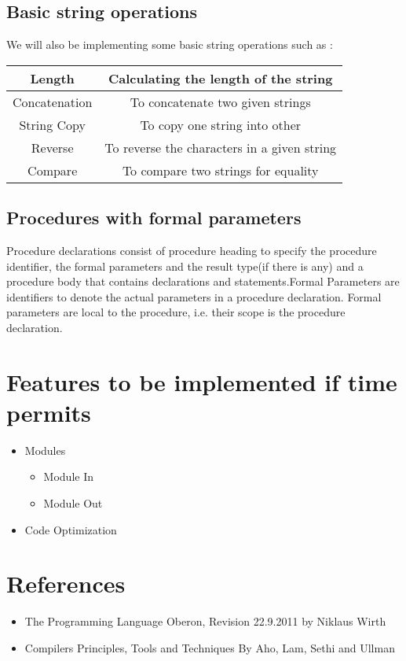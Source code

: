 \documentclass{article}
\begin{document}
\subsection{Basic string operations}
We will also be implementing some basic string operations such as : 
\begin{center}
\begin{tabular}{|c|c|}
\hline
Length & Calculating the length of the string \\ \hline
Concatenation & To concatenate two given strings \\ \hline
String Copy & To copy one string into other \\ \hline
Reverse & To reverse the characters in a given string \\ \hline
Compare & To compare two strings for equality \\ \hline
\end{tabular}
\end{center}

\subsection{Procedures with formal parameters}
Procedure declarations consist of procedure heading to specify the procedure identifier, the formal parameters and the result type(if there is any) and a procedure body that contains declarations and statements.Formal Parameters are identifiers to denote the actual parameters in a procedure declaration. Formal parameters are local to the procedure, i.e. their scope is the procedure declaration.

\section{Features to be implemented if time permits}
\begin{itemize}
\item Modules
\begin{itemize}
\item Module In
\item Module Out
\end{itemize}
\item Code Optimization
\end{itemize}
\section {References}
\begin{itemize}
\item The Programming Language Oberon, Revision 22.9.2011 by Niklaus Wirth
\item Compilers Principles, Tools and Techniques By Aho, Lam, Sethi and Ullman
\end{itemize}
\end{document}
